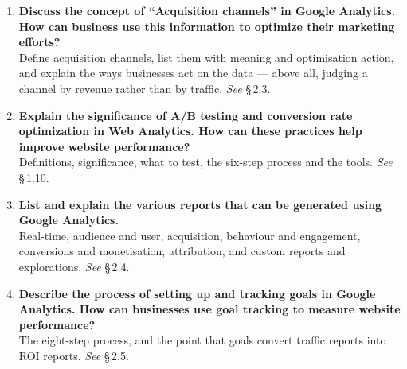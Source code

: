 \begin{enumerate}[leftmargin=2.2em,itemsep=1.4ex]
\item \textbf{Discuss the concept of ``Acquisition channels'' in Google
      Analytics. How can business use this information to optimize their
      marketing efforts?} \\
      Define acquisition channels, list them with meaning and optimisation
      action, and explain the ways businesses act on the data --- above all,
      judging a channel by revenue rather than by traffic.
      \hfill\emph{See} \S\,2.3.

\item \textbf{Explain the significance of A/B testing and conversion rate
      optimization in Web Analytics. How can these practices help improve website
      performance?} \\
      Definitions, significance, what to test, the six-step process and the
      tools. \hfill\emph{See} \S\,1.10.

\item \textbf{List and explain the various reports that can be generated using
      Google Analytics.} \\
      Real-time, audience and user, acquisition, behaviour and engagement,
      conversions and monetisation, attribution, and custom reports and
      explorations. \hfill\emph{See} \S\,2.4.

\item \textbf{Describe the process of setting up and tracking goals in Google
      Analytics. How can businesses use goal tracking to measure website
      performance?} \\
      The eight-step process, and the point that goals convert traffic reports
      into ROI reports. \hfill\emph{See} \S\,2.5.


\end{enumerate}
